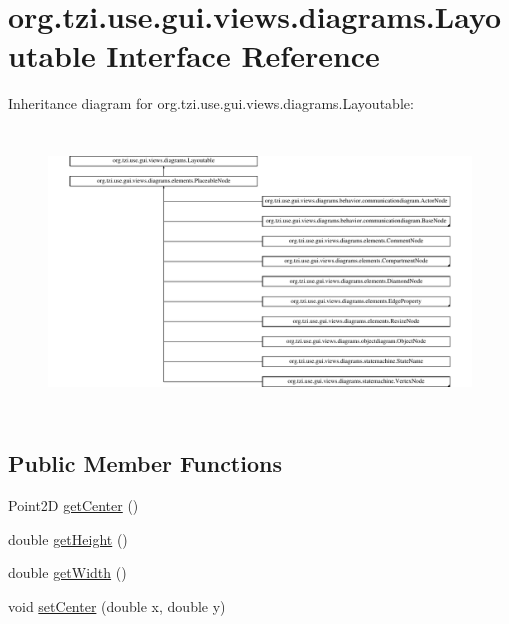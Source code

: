 \hypertarget{interfaceorg_1_1tzi_1_1use_1_1gui_1_1views_1_1diagrams_1_1_layoutable}{\section{org.\-tzi.\-use.\-gui.\-views.\-diagrams.\-Layoutable Interface Reference}
\label{interfaceorg_1_1tzi_1_1use_1_1gui_1_1views_1_1diagrams_1_1_layoutable}
}
Inheritance diagram for org.\-tzi.\-use.\-gui.\-views.\-diagrams.\-Layoutable\-:\begin{figure}[H]
\begin{center}
\leavevmode
\includegraphics[height=7.601810cm]{interfaceorg_1_1tzi_1_1use_1_1gui_1_1views_1_1diagrams_1_1_layoutable}
\end{center}
\end{figure}
\subsection*{Public Member Functions}
\begin{DoxyCompactItemize}
\item 
Point2\-D \hyperlink{interfaceorg_1_1tzi_1_1use_1_1gui_1_1views_1_1diagrams_1_1_layoutable_a4a0efc62f3e9d31f68f1cdf40c87e8df}{get\-Center} ()
\item 
double \hyperlink{interfaceorg_1_1tzi_1_1use_1_1gui_1_1views_1_1diagrams_1_1_layoutable_a7c11ec1e807f20bb476047b507542fbd}{get\-Height} ()
\item 
double \hyperlink{interfaceorg_1_1tzi_1_1use_1_1gui_1_1views_1_1diagrams_1_1_layoutable_a25589fceac4d755885c12af97eda66df}{get\-Width} ()
\item 
void \hyperlink{interfaceorg_1_1tzi_1_1use_1_1gui_1_1views_1_1diagrams_1_1_layoutable_a05403c4c1f2efdd5981027766dfabd29}{set\-Center} (double x, double y)
\end{DoxyCompactItemize}


